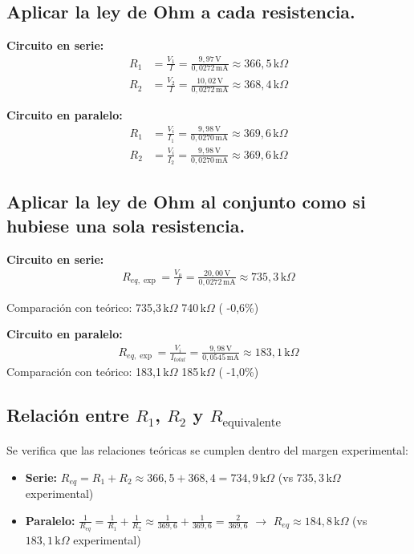 \documentclass[11pt,twocolumn]{article}
\begin{document}
\subsection{Aplicar la ley de Ohm a cada resistencia.}

\textbf{Circuito en serie:}
\begin{align*}
R_1 &= \frac{V_1}{I} = \frac{9,97\,\text{V}}{0,0272\,\text{mA}} \approx 366,5\,\text{k}\Omega \\
R_2 &= \frac{V_2}{I} = \frac{10,02\,\text{V}}{0,0272\,\text{mA}} \approx 368,4\,\text{k}\Omega
\end{align*}

\textbf{Circuito en paralelo:}
\begin{align*}
R_1 &= \frac{V_i}{I_1} = \frac{9,98\,\text{V}}{0,0270\,\text{mA}} \approx 369,6\,\text{k}\Omega \\
R_2 &= \frac{V_i}{I_2} = \frac{9,98\,\text{V}}{0,0270\,\text{mA}} \approx 369,6\,\text{k}\Omega
\end{align*}

\subsection{Aplicar la ley de Ohm al conjunto como si hubiese una sola resistencia. }

\textbf{Circuito en serie:}
\begin{align*}
R_{eq,\exp} = \frac{V_0}{I} = \frac{20,00\,\text{V}}{0,0272\,\text{mA}} \approx 735,3\,\text{k}\Omega 
\end{align*}

Comparación con teórico: 735,3\,$\text{k}\Omega$  740\,$\text{k}\Omega$ \quad ( -0,6\%)

\textbf{Circuito en paralelo:}
\begin{align*}
R_{eq,\exp} = \frac{V_i}{I_{total}} = \frac{9,98\,\text{V}}{0,0545\,\text{mA}} \approx 183,1\,\text{k}\Omega 
\end{align*}
Comparación con teórico: 183,1\,$\text{k}\Omega$  185\,$\text{k}\Omega$ \quad ( -1,0\%)

\subsection{Relación entre \texorpdfstring{$R_1$, $R_2$ y $R_{\mathrm{equivalente}}$}{R1, R2 y Requivalente}}
Se verifica que las relaciones teóricas se cumplen dentro del margen experimental:

\begin{itemize}
\item \textbf{Serie:} $R_{eq} = R_1 + R_2 \approx 366,5 + 368,4 = 734,9\,\text{k}\Omega$ (vs $735,3\,\text{k}\Omega$ experimental)
\item \textbf{Paralelo:} $\frac{1}{R_{eq}} = \frac{1}{R_1} + \frac{1}{R_2} \approx \frac{1}{369,6} + \frac{1}{369,6} = \frac{2}{369,6}$ $\rightarrow$ $R_{eq} \approx 184,8\,\text{k}\Omega$ (vs $183,1\,\text{k}\Omega$ experimental)
\end{itemize}
\end{document}
